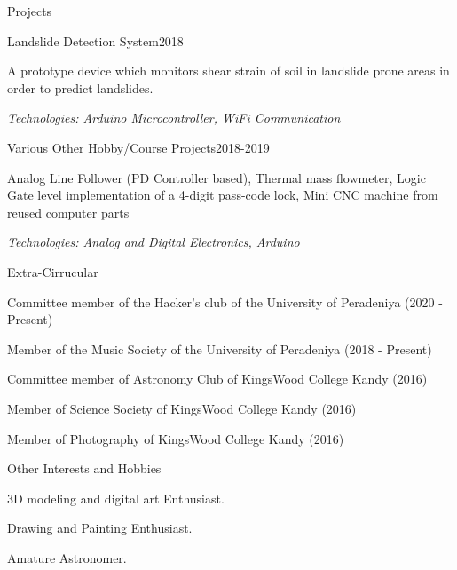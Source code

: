 \documentclass{resume} %
\begin{document}
\begin{rSection}{Projects}
\begin{rSubsection}{Landslide Detection System}{2018}{}{}
\item A prototype device which monitors shear strain of soil in landslide prone areas in order to predict landslides.
\item \textit{Technologies: Arduino Microcontroller, WiFi Communication}
\end{rSubsection}


\begin{rSubsection}{Various Other Hobby/Course Projects}{2018-2019}{}{}
\item Analog Line Follower (PD Controller based), Thermal mass flowmeter, Logic Gate level implementation of a 4-digit pass-code lock, Mini CNC machine from reused computer parts
\item \textit{Technologies: Analog and Digital Electronics, Arduino}
\end{rSubsection}





\end{rSection}

\begin{rSection}{Extra-Cirrucular} \itemsep -3pt
\item Committee member of the Hacker's club of the University of Peradeniya (2020 - Present)
\item Member of the Music Society of the University of Peradeniya (2018 - Present)
\item Committee member of Astronomy Club of KingsWood College Kandy (2016)
\item Member of Science Society of KingsWood College Kandy (2016)
\item Member of Photography of KingsWood College Kandy (2016)

 
\end{rSection}


\begin{rSection}{Other Interests and Hobbies} \itemsep -3pt
\item 3D modeling and digital art Enthusiast.
\item Drawing and Painting Enthusiast.
\item Amature Astronomer.


\end{rSection}
\end{document}
